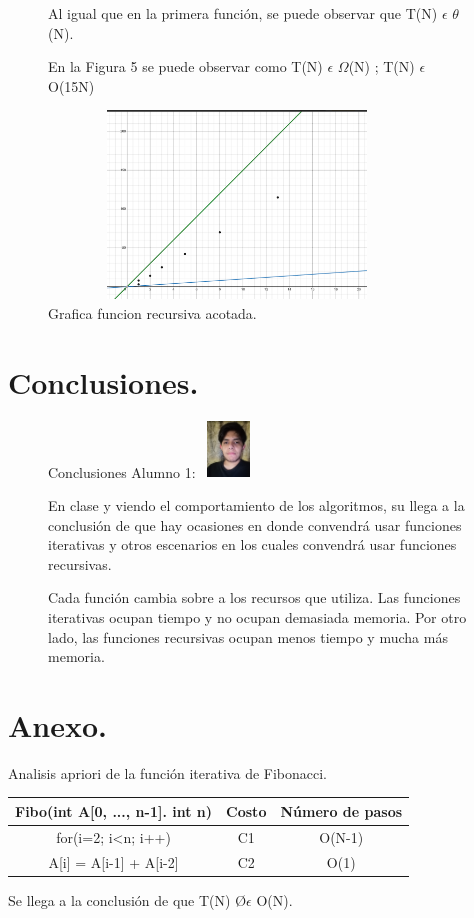 \documentclass{report}
\begin{document}
	\begin{figure}[h]
		\large Al igual que en la primera función, se puede observar que T(N) $\epsilon$  $\theta$(N).\par
		\large En la Figura 5 se puede observar como T(N) $\epsilon$  $\Omega$(N) ; T(N) $\epsilon$  O(15N) \par
		\centering
			\includegraphics[width=10cm, height=5cm]{5} \par
		\caption{Grafica funcion recursiva acotada.}
	\end{figure}
	\newpage

	\section*{Conclusiones.}
	\begin{figure}[h]
		\begin{bf}
			\large Conclusiones Alumno 1: 
			\includegraphics[width=1.5cm, height=1.5cm]{alumno} \par
		\end{bf}
		\large  En clase y viendo el comportamiento de los algoritmos, su llega a la conclusión de que hay ocasiones en donde convendrá usar funciones iterativas y otros escenarios en los cuales convendrá usar funciones recursivas.\par
		\large  Cada función cambia sobre a los recursos que utiliza. Las funciones iterativas ocupan tiempo y no ocupan demasiada memoria. Por otro lado, las funciones recursivas ocupan menos tiempo y mucha más memoria.\par
	\end{figure}
		
	\section*{Anexo.}
	\large Analisis apriori de la función iterativa de Fibonacci.\par 
	\begin{tabular}{| c | c | c |}
		\hline
		Fibo(int A[0, ..., n-1]. int n) & Costo & Número de pasos \\ \hline
		for(i=2; i<n; i++) & C1 & O(N-1)\\
		A[i] = A[i-1] + A[i-2] & C2 & O(1)\\ \hline
	\end{tabular}\par
	\large Se llega a la conclusión de que T(N) \O $\epsilon$  O(N).\par 
	
\end{document}
